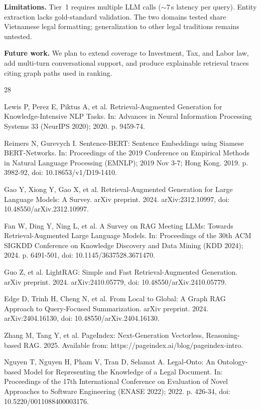 \documentclass{IOS-Book-Article}
\begin{document}
\textbf{Limitations.} Tier~1 requires multiple LLM calls ($\sim$7\,s latency per query). Entity extraction lacks gold-standard validation. The two domains tested share Vietnamese legal formatting; generalization to other legal traditions remains untested.

\textbf{Future work.} We plan to extend coverage to Investment, Tax, and Labor law, add multi-turn conversational support, and produce explainable retrieval traces citing graph paths used in ranking.

\begin{thebibliography}{28}
\setlength{\itemsep}{0pt}\setlength{\parsep}{0pt}\setlength{\parskip}{0pt}

Lewis P, Perez E, Piktus A, et al. Retrieval-Augmented Generation for Knowledge-Intensive NLP Tasks. In: Advances in Neural Information Processing Systems 33 (NeurIPS 2020); 2020. p. 9459-74.

Reimers N, Gurevych I. Sentence-BERT: Sentence Embeddings using Siamese BERT-Networks. In: Proceedings of the 2019 Conference on Empirical Methods in Natural Language Processing (EMNLP); 2019 Nov 3-7; Hong Kong. 2019. p. 3982-92, doi: 10.18653/v1/D19-1410.

Gao Y, Xiong Y, Gao X, et al. Retrieval-Augmented Generation for Large Language Models: A Survey. arXiv preprint. 2024. arXiv:2312.10997, doi: 10.48550/arXiv.2312.10997.

Fan W, Ding Y, Ning L, et al. A Survey on RAG Meeting LLMs: Towards Retrieval-Augmented Large Language Models. In: Proceedings of the 30th ACM SIGKDD Conference on Knowledge Discovery and Data Mining (KDD 2024); 2024. p. 6491-501, doi: 10.1145/3637528.3671470.

Guo Z, et al. LightRAG: Simple and Fast Retrieval-Augmented Generation. arXiv preprint. 2024. arXiv:2410.05779, doi: 10.48550/arXiv.2410.05779.

Edge D, Trinh H, Cheng N, et al. From Local to Global: A Graph RAG Approach to Query-Focused Summarization. arXiv preprint. 2024. arXiv:2404.16130, doi: 10.48550/arXiv.2404.16130.

Zhang M, Tang Y, et al. PageIndex: Next-Generation Vectorless, Reasoning-based RAG. 2025. Available from: https://pageindex.ai/blog/pageindex-intro.

Nguyen T, Nguyen H, Pham V, Tran D, Selamat A. Legal-Onto: An Ontology-based Model for Representing the Knowledge of a Legal Document. In: Proceedings of the 17th International Conference on Evaluation of Novel Approaches to Software Engineering (ENASE 2022); 2022. p. 426-34, doi: 10.5220/0011088400003176.


\end{thebibliography}
\end{document}
